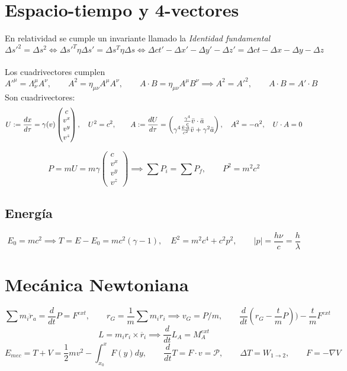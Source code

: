 \documentclass[leqno]{article}
\newcommand{\1}{\tikz[baseline=(char.base)]{
            \node[shape=circle,draw,inner sep=1pt] (char) {1};}}
\newcommand{\2}{\tikz[baseline=(char.base)]{
            \node[shape=circle,draw,inner sep=1pt] (char) {2};}}
\newcommand{\dt}{\frac{d}{dt}}
\begin{document}
\section{Espacio-tiempo y 4-vectores}
En relatividad se cumple un invariante llamado la \textit{Identidad fundamental}
$$
\Delta s'^2 = \Delta s^2 \iff \Delta s'^T \eta \Delta s' = \Delta s^T \eta \Delta s \iff \Delta ct' - \Delta x'- \Delta y'- \Delta z' = \Delta ct - \Delta x- \Delta y- \Delta z
$$
\\
Los cuadrivectores cumplen
$$A'^\mu = \Lambda^\mu_\nu A^\nu, \qquad A^2 = \eta_{\mu\nu}A^{\mu}A^\nu, \qquad A\cdot B = \eta_{\mu\nu}A^{\mu}B^\nu \implies A^2 = A'^2, \qquad A\cdot B = A'\cdot B $$
Son cuadrivectores:
$$
U:=\frac{dx}{d\tau} = \gamma(v)\begin{pmatrix}
c\\
v^x \\
v^y\\
v^z
\end{pmatrix}, \quad U^2 = c^2, \qquad A:=\frac{dU}{d\tau} = \begin{pmatrix}
\frac{\gamma^4}{c}\Bar{v}\cdot \Bar{a}\\
\gamma^4\frac{\Bar{v}\cdot\Bar{a}}{c^2}\Bar{v} + \gamma^2\Bar{a} \\
\end{pmatrix}, \quad A^2 = -\alpha^2, \quad U\cdot A =0
$$

$$
P =  mU = m\gamma\begin{pmatrix}
c\\
v^x \\
v^y\\
v^z
\end{pmatrix} \implies \sum P_i = \sum P_f, \qquad P^2=m^2c^2
$$
\subsection{Energía}
$$
E_0=mc^2 \implies T = E-E_0 = mc^2(\gamma - 1), \quad E^2 = m^2c^4 + c^2p^2, \qquad |p|=\frac{h\nu}{c} = \frac{h}{\lambda}
$$
\section{Mecánica Newtoniana}
$$
\sum m_i\ddot{r}_a = \frac{d}{dt} P = F^{ext}, \qquad r_G = \frac{1}{m}\sum m_ir_i \implies v_G = P/m, \qquad \dt (r_G - \frac{t}{m}P) ) -\frac{t}{m} F^{ext}
$$
$$
L = m_ir_i\times \ddot{r_i} \implies \dt L_A = M_A^{ext}
$$
$$
E_{mec} = T+V = \frac{1}{2}mv^2 - \int_{x_0}^{x}F(y)dy, \qquad \dt T = F\cdot v=\mathcal{P}, \qquad \Delta T = W_{1\to 2}, \qquad F = -\nabla V
$$
\end{document}
